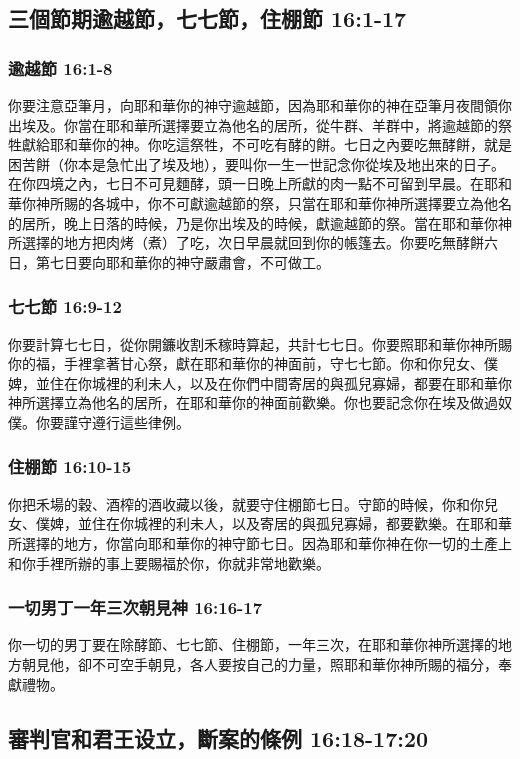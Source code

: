 \subsection{三個節期逾越節，七七節，住棚節 16:1-17 }
\subsubsection{逾越節 16:1-8}
你要注意亞筆月，向耶和華你的神守逾越節，因為耶和華你的神在亞筆月夜間領你出埃及。你當在耶和華所選擇要立為他名的居所，從牛群、羊群中，將逾越節的祭牲獻給耶和華你的神。你吃這祭牲，不可吃有酵的餅。七日之內要吃無酵餅，就是困苦餅（你本是急忙出了埃及地），要叫你一生一世記念你從埃及地出來的日子。在你四境之內，七日不可見麵酵，頭一日晚上所獻的肉一點不可留到早晨。在耶和華你神所賜的各城中，你不可獻逾越節的祭，只當在耶和華你神所選擇要立為他名的居所，晚上日落的時候，乃是你出埃及的時候，獻逾越節的祭。當在耶和華你神所選擇的地方把肉烤（煮）了吃，次日早晨就回到你的帳篷去。你要吃無酵餅六日，第七日要向耶和華你的神守嚴肅會，不可做工。

\subsubsection{七七節 16:9-12}
你要計算七七日，從你開鐮收割禾稼時算起，共計七七日。你要照耶和華你神所賜你的福，手裡拿著甘心祭，獻在耶和華你的神面前，守七七節。你和你兒女、僕婢，並住在你城裡的利未人，以及在你們中間寄居的與孤兒寡婦，都要在耶和華你神所選擇立為他名的居所，在耶和華你的神面前歡樂。你也要記念你在埃及做過奴僕。你要謹守遵行這些律例。

\subsubsection{住棚節 16:10-15}
你把禾場的穀、酒榨的酒收藏以後，就要守住棚節七日。守節的時候，你和你兒女、僕婢，並住在你城裡的利未人，以及寄居的與孤兒寡婦，都要歡樂。在耶和華所選擇的地方，你當向耶和華你的神守節七日。因為耶和華你神在你一切的土產上和你手裡所辦的事上要賜福於你，你就非常地歡樂。

\subsubsection{一切男丁一年三次朝見神 16:16-17}
你一切的男丁要在除酵節、七七節、住棚節，一年三次，在耶和華你神所選擇的地方朝見他，卻不可空手朝見，各人要按自己的力量，照耶和華你神所賜的福分，奉獻禮物。

\subsection{審判官和君王设立，斷案的條例 16:18-17:20}
